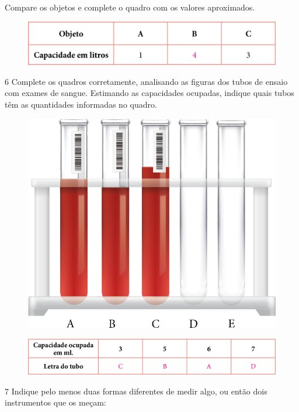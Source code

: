 Compare os objetos e complete o quadro com os valores aproximados.

\begin{figure}[htpb!]
\includegraphics[width=\textwidth]{./media/image35.png}
\end{figure}


\num{6} Complete os quadros corretamente, analisando as figuras dos tubos de
ensaio com exames de sangue. Estimando as capacidades ocupadas, indique
quais tubos têm as quantidades informadas no quadro.


\begin{figure}[htpb!]
\centering\includegraphics[width=.4\textwidth]{./media/image36.png}
\end{figure}

\begin{figure}[htpb!]
\includegraphics[width=\textwidth]{./media/image37.png}
\end{figure}

\pagebreak

\num{7} Indique pelo menos duas formas diferentes de medir algo, ou então dois
instrumentos que os meçam:

